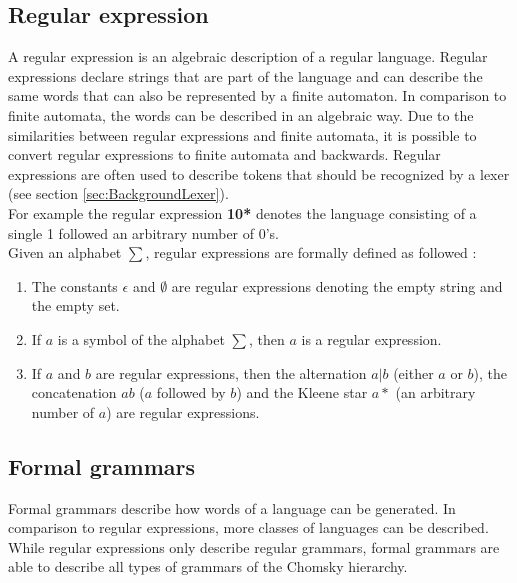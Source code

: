 \subsection{Regular expression}\label{sec:BackgroundRegEx}

A regular expression is an algebraic description of a regular language.
Regular expressions declare strings that are part of the language and can describe the same words that can also be represented by a finite automaton. 
In comparison to finite automata, the words can be described in an algebraic way. 
Due to the similarities between regular expressions and finite automata, it is possible to convert regular expressions to finite automata and backwards. 
Regular expressions are often used to describe tokens that should be recognized by a lexer (see section \ref{sec:BackgroundLexer}). \cite{AutomataTheory.2007}\\
For example the regular expression \textbf{10*} denotes the language consisting of a single 1 followed an arbitrary number of 0's.\\
Given an alphabet $\sum$, regular expressions are formally defined as followed \cite{AutomataTheory.2007}:
\begin{enumerate}
\item The constants $\epsilon$ and $\emptyset$ are regular expressions denoting the empty string and the empty set.
\item If $a$ is a symbol of the alphabet $\sum$, then $a$ is a regular expression.
\item If $a$ and $b$ are regular expressions, then the alternation $a|b$ (either $a$ or $b$), the concatenation $ab$ ($a$ followed by $b$) and the Kleene star $a*$ (an arbitrary number of $a$) are regular expressions.
\end{enumerate}


\subsection{Formal grammars}\label{sec:BackgroundGrammar}

Formal grammars describe how words of a language can be generated. In comparison to regular expressions, more classes of languages can be described. While regular expressions only describe regular grammars, formal grammars are able to describe all types of grammars of the Chomsky hierarchy.


